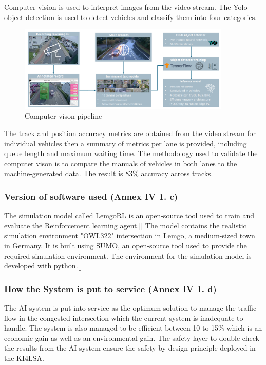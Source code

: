 Computer vision is used to interpret images from the video stream. The Yolo object detection is used to detect vehicles and classify them into four categories. 
\begin{figure}[h]
        \centering
        \includegraphics[width=0.9\textwidth]{paper-template/figs/computer vison.png}
        \caption{Computer vison pipeline}
        \label{fig:my_label}
\end{figure} 
The track and position accuracy metrics are obtained from the video stream for individual vehicles then a summary of metrics per lane is provided, including queue length and maximum waiting time. The methodology used to validate the computer vison is to compare the manuals of vehicles in both lanes to the machine-generated data. The result is 83\% accuracy across tracks.
   \subsubsection{Version of software used (Annex IV 1. c)}
The simulation model called LemgoRL is an open-source tool used to train and evaluate the Reinforcement learning agent.[\citet{traffic_signal_control_with_rl}] The model contains the realistic simulation environment "OWL322" intersection in Lemgo, a medium-sized town in Germany. It is built using SUMO, an open-source tool used to provide the required simulation environment. The environment for the 
simulation model is developed with python.[\citet{traffic_signal_control_with_rl}]
  \subsubsection{How the System is put to service (Annex IV 1. d)}
The AI system is put into service as the optimum solution to manage the traffic flow in the congested intersection which the current system is inadequate to handle. The system is also managed to be efficient between 10 to 15\% which is an economic gain as well as an environmental gain. The safety layer to double-check the results from the AI system ensure the safety by design principle deployed in the KI4LSA. 
